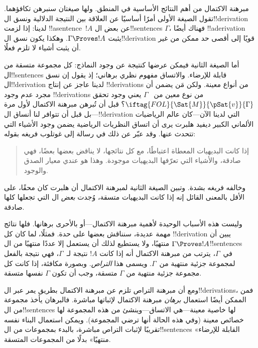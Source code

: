\documentclass[../../../include/open-logic-section]{subfiles}
\begin{document}
      {}
      {}


مبرهنة الاكتمال من أهم النتائج الأساسية في المنطق. ولها صيغتان سنبرهن
تكافؤهما. تقول الصيغة الأولى أمرًا أساسيًا عن العلاقة بين النتيجة
الدلالية ونسق ال!!{derivation} لدينا: إذا لزمت !!a{sentence}~$!A$ عن
بعض ال!!{sentence}s $\Gamma$، فهناك أيضًا !!a{derivation} يثبت
$\Gamma \Proves !A$. وهكذا يكون نسق ال!!{derivation} قويًا إلى أقصى
حد ممكن من غير أن يثبت أشياء لا تلزم فعلًا.

أما الصيغة الثانية فيمكن عرضها كنتيجة عن وجود النماذج: كل مجموعة متسقة
من ال!!{sentence}s قابلة للإرضاء. والاتساق مفهوم نظري برهاني؛ إذ يقول
إن نسق ال!!{derivation} لدينا عاجز عن إنتاج !!{derivation}s من أنواع
معينة. ولكن مَن يضمن أن مجرد عدم وجود !!{derivation}s من نوع معين من
~$\Gamma$ يعني وجود
تحقق $\iftag{FOL}{\Sat{M}}{\pSat{v}}{\Gamma}$؟ قبل أن تُبرهن مبرهنة
الاكتمال لأول مرة---بل قبل أن تتوافر لنا أنساق ال!!{derivation} التي
لدينا الآن---كان عالم الرياضيات الألماني الكبير ديفيد هلبرت يرى أن
اتساق النظريات الرياضية يضمن وجود الأشياء التي تتحدث عنها. وقد عبّر عن
ذلك في رسالة إلى غوتلوب فريغه بقوله:
\begin{quote}
  إذا كانت البديهيات المعطاة اعتباطًا، مع كل نتائجها، لا يناقض بعضها
  بعضًا، فهي صادقة، والأشياء التي تعرّفها البديهيات موجودة. وهذا هو عندي
  معيار الصدق والوجود.
\end{quote}
وخالفه فريغه بشدة. وتبين الصيغة الثانية لمبرهنة الاكتمال أن هلبرت كان
محقًا، على الأقل بالمعنى القائل إنه إذا كانت البديهيات متسقة، وُجدت
\emph{بعض} ال التي تجعلها
كلها صادقة.

وليست هذه الأسباب الوحيدة لأهمية مبرهنة الاكتمال---أو بالأحرى برهانها.
فلها نتائج مهمة عديدة، سنناقش بعضها على حدة. فمثلًا، لما كان كل
!!{derivation} يبين أن $\Gamma \Proves !A$ منتهيًا، ولا يستطيع لذلك أن
يستعمل إلا عددًا منتهيًا من ال!!{sentence}s في~$\Gamma$، يترتب من
مبرهنة الاكتمال أنه إذا كانت $!A$ نتيجة لـ~$\Gamma$، فهي نتيجة بالفعل
لمجموعة جزئية منتهية من~$\Gamma$. ويسمى هذا \emph{التراص}. وبصورة
مكافئة، إذا كانت كل مجموعة جزئية منتهية من $\Gamma$ متسقة، وجب أن تكون
$\Gamma$ نفسها متسقة.

ومع أن مبرهنة التراص تلزم عن مبرهنة الاكتمال بطريق يمر عبر
ال!!{derivation}s، فمن الممكن أيضًا استعمال \emph{برهان} مبرهنة
الاكتمال لإثباتها مباشرة. فالبرهان يأخذ مجموعة من ال!!{sentence}s لها
خاصية معينة---هي الاتساق---وينشئ من هذه المجموعة
 لها خصائص معينة (وفي هذه
الحالة أنها ترضي المجموعة). ويمكن استعمال البناء نفسه تقريبًا لإثبات
التراص مباشرة، بالبدء بمجموعات من ال!!{sentence}s «القابلة للإرضاء
منتهيًا» بدلًا من المجموعات المتسقة.
\end{document}
